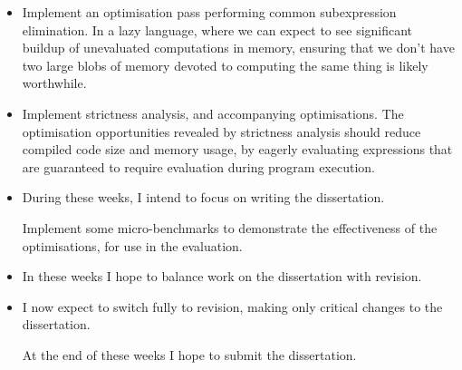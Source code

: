 \documentclass[12pt]{article}
\begin{document}
\begin{itemize}
{    I will also write my progress report and presentation during these weeks.
}
\item
{

    Implement an optimisation pass performing common subexpression elimination. In a lazy language, where we can expect
    to see significant buildup of unevaluated computations in memory, ensuring that we don't have two large blobs of
    memory devoted to computing the same thing is likely worthwhile.

}
\item
{

    Implement strictness analysis, and accompanying optimisations. The optimisation opportunities revealed by
    strictness analysis should reduce compiled code size and memory usage, by eagerly evaluating expressions that are
    guaranteed to require evaluation during program execution.
}
\item
{

    During these weeks, I intend to focus on writing the dissertation.

    Implement some micro-benchmarks to demonstrate the effectiveness of the optimisations, for use in the evaluation.
}
\item
{

    In these weeks I hope to balance work on the dissertation with revision.
}
\item
{

    I now expect to switch fully to revision, making only critical changes to the dissertation.

    At the end of these weeks I hope to submit the dissertation.
}
\end{itemize}
\end{document}
